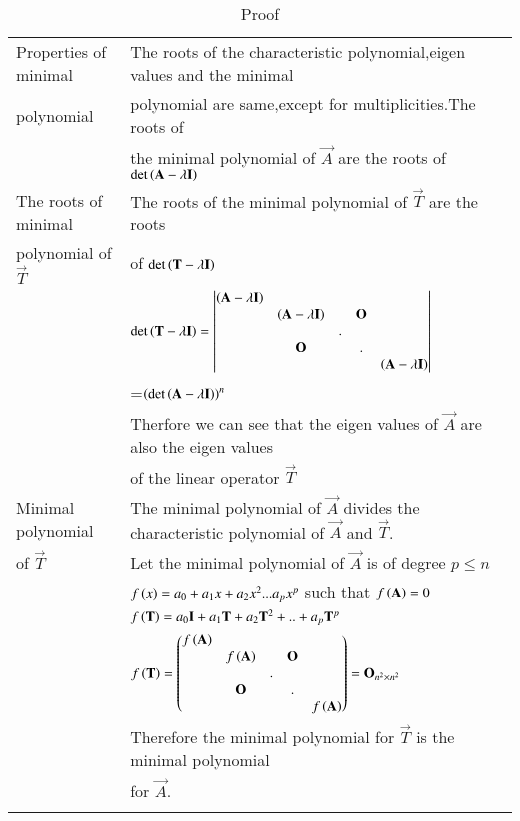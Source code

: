 \begin{longtable}{|l|l|}
    \hline
        Properties of minimal & The roots of the characteristic polynomial,eigen values and the minimal  \\
        polynomial &polynomial are same,except for multiplicities.The roots of\\
        & the minimal polynomial of $\vec{A}$ are the roots of $\det\left(\mathbf{A}-\lambda\mathbf{I}\right)$\\
    \hline
        The roots of minimal & The roots of the minimal polynomial of $\vec{T}$ are the roots\\
        polynomial of $\vec{T}$& of $\det \left(\mathbf{T}-\lambda\mathbf{I}\right)$\\
        &$\det \left(\mathbf{T}-\lambda\mathbf{I}\right)=\begin{vmatrix}\left(\mathbf{A}-\lambda\mathbf{I}\right)&&&&\\&\left(\mathbf{A}-\lambda\mathbf{I}\right)&&\mathbf{O}&\\&&.&&\\&\mathbf{O}&&.&\\&&&&\left(\mathbf{A}-\lambda\mathbf{I}\right)\end{vmatrix}$\\
        &=$\left(\det \left(\mathbf{A}-\lambda\mathbf{I}\right)\right)^{n}$\\
        & Therfore we can see that the eigen values of $\vec{A}$ are also the eigen values \\
        &of the linear operator $\vec{T}$\\
    \hline
        Minimal polynomial  & The minimal polynomial of $\vec{A}$ divides the characteristic polynomial of $\vec{A}$ and  $\vec{T}$.\\
        of $\vec{T}$ & Let the minimal polynomial of $\vec{A}$ is of degree $p\leq n$\\
        & $f\left(x\right)=a_0+a_1x+a_2x^2...a_px^p$ such that $f\left(\mathbf{A}\right)=0$\\
        &$f\left(\mathbf{T}\right)=a_0\mathbf{I}+a_1\mathbf{T}+a_2\mathbf{T}^2+..+a_p\mathbf{T}^p$\\
    \hline
        &$f\left(\mathbf{T}\right)=\begin{pmatrix}f\left(\mathbf{A}\right)&&&&\\&f\left(\mathbf{A}\right)&&\mathbf{O}&\\&&.&&\\&\mathbf{O}&&.&\\&&&&f\left(\mathbf{A}\right)\end{pmatrix}=\mathbf{O}_{n^2\times n^2}$\\
        &Therefore the minimal polynomial for $\vec{T}$ is the minimal polynomial\\
        & for $\vec{A}$.\\
    \hline
    \caption{Proof}
    \label{eq:solutions/6/3/10/tab:proof}
\end{longtable}
